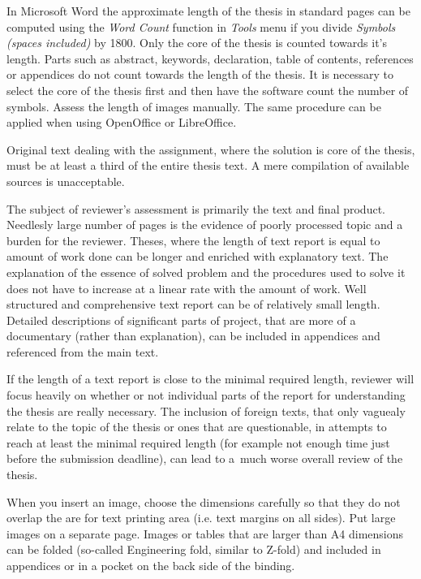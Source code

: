 In Microsoft Word the approximate length of the thesis in standard pages can be computed using the {\it Word Count} function in {\it Tools} menu if you divide {\it Symbols (spaces included)} by 1800. Only the core of the thesis is counted towards it's length. Parts such as abstract, keywords, declaration, table of contents, references or appendices do not count towards the length of the thesis. It is necessary to select the core of the thesis first and then have the software count the number of symbols. Assess the length of images manually. The same procedure can be applied when using OpenOffice or LibreOffice. 

Original text dealing with the assignment, where the solution is core of the thesis, must be at least a third of the entire thesis text. A mere compilation of available sources is unacceptable.

The subject of reviewer's assessment is primarily the text and final product.
Needlesly large number of pages is the evidence of poorly processed topic and a burden for the reviewer. Theses, where the length of text report is equal to amount of work done can be longer and enriched with explanatory text. The explanation of the essence of solved problem and the procedures used to solve it does not have to increase at a linear rate with the amount of work. Well structured and comprehensive text report can be of relatively small length. Detailed descriptions of significant parts of project, that are more of a documentary (rather than explanation), can be included in appendices and referenced from the main text.

If the length of a text report is close to the minimal required length, reviewer will focus heavily on whether or not individual parts of the report for understanding the thesis are really necessary. The inclusion of foreign texts, that only vaguealy relate to the topic of the thesis or ones that are questionable, in attempts to reach at least the minimal required length (for example not enough time just before the submission deadline), can lead to a~much worse overall review of the thesis.

When you insert an image, choose the dimensions carefully so that they do not overlap the are for text printing area (i.e. text margins on all sides). Put large images on a separate page. Images or tables that are larger than A4 dimensions can be folded (so-called Engineering fold, similar to Z-fold) and included in appendices or in a pocket on the back side of the binding.

